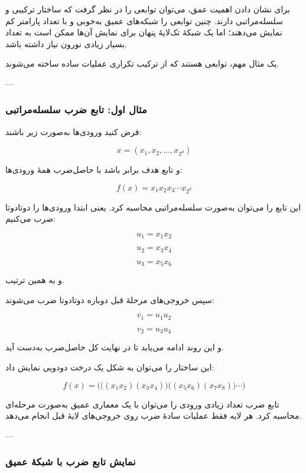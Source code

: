 \documentclass[12pt,a4paper]{article}
\begin{document}
برای نشان دادن اهمیت عمق، می‌توان توابعی را در نظر گرفت که ساختار ترکیبی و سلسله‌مراتبی دارند. چنین توابعی را شبکه‌های عمیق به‌خوبی و با تعداد پارامتر کم نمایش می‌دهند؛ اما یک شبکهٔ تک‌لایهٔ پنهان برای نمایش آن‌ها ممکن است به تعداد بسیار زیادی نورون نیاز داشته باشد.

یک مثال مهم، توابعی هستند که از ترکیب تکراری عملیات ساده ساخته می‌شوند.

---

\subsubsection{مثال اول: تابع ضرب سلسله‌مراتبی}

فرض کنید ورودی‌ها به‌صورت زیر باشند:

\[
x=(x_1,x_2,\ldots,x_{2^d})
\]

و تابع هدف برابر باشد با حاصل‌ضرب همهٔ ورودی‌ها:

\[
f(x)=x_1x_2x_3\cdots x_{2^d}
\]

این تابع را می‌توان به‌صورت سلسله‌مراتبی محاسبه کرد. یعنی ابتدا ورودی‌ها را دوتادوتا ضرب می‌کنیم:

\[
u_1=x_1x_2
\]

\[
u_2=x_3x_4
\]

\[
u_3=x_5x_6
\]

و به همین ترتیب.

سپس خروجی‌های مرحلهٔ قبل دوباره دوتادوتا ضرب می‌شوند:

\[
v_1=u_1u_2
\]

\[
v_2=u_3u_4
\]

و این روند ادامه می‌یابد تا در نهایت کل حاصل‌ضرب به‌دست آید.

این ساختار را می‌توان به شکل یک درخت دودویی نمایش داد:

\[
f(x)=
\Big(
\big((x_1x_2)(x_3x_4)\big)
\big((x_5x_6)(x_7x_8)\big)
\cdots
\Big)
\]

\begin{tcolorbox}[
	colback=lightblue,
	colframe=mainblue,
	title=ساختار سلسله‌مراتبی تابع ضرب
	]
	تابع ضرب تعداد زیادی ورودی را می‌توان با یک معماری عمیق به‌صورت مرحله‌ای محاسبه کرد. هر لایه فقط عملیات سادهٔ ضرب روی خروجی‌های لایهٔ قبل انجام می‌دهد.
\end{tcolorbox}

---

\subsubsection{نمایش تابع ضرب با شبکهٔ عمیق}
\end{document}
